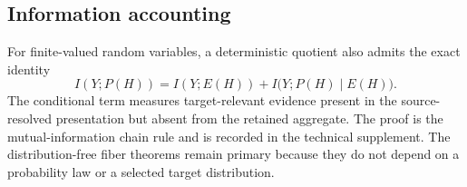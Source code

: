 \subsection{Information accounting}

For finite-valued random variables, a deterministic quotient also admits the exact identity
\[
I(Y;P(H))
=
I(Y;E(H))
+
I\bigl(Y;P(H)\mid E(H)\bigr).
\]
The conditional term measures target-relevant evidence present in the source-resolved presentation but absent from the retained aggregate. The proof is the mutual-information chain rule and is recorded in the technical supplement. The distribution-free fiber theorems remain primary because they do not depend on a probability law or a selected target distribution.
